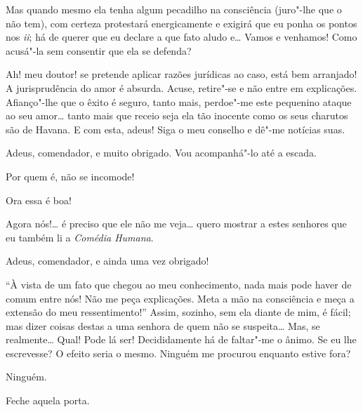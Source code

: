   Mas quando mesmo ela tenha algum pecadilho na
consciência (juro"-lhe que o não tem), com certeza protestará
energicamente e exigirá que eu ponha os pontos nos \textit{ii}; há de
querer que eu declare a que fato aludo e\ldots{} Vamos e venhamos! Como
acusá"-la sem consentir que ela se defenda?

 Ah! meu doutor! se pretende aplicar razões
jurídicas ao caso, está bem arranjado! A jurisprudência do amor é
absurda. Acuse, retire"-se e não entre em explicações. Afianço"-lhe que o
êxito é seguro, tanto mais, perdoe"-me este pequenino ataque ao seu
amor\ldots{}  tanto mais que receio seja ela tão inocente como os seus
charutos são de Havana.  E com esta, adeus! Siga o meu conselho e dê"-me
notícias suas. 

   Adeus, comendador,
e muito obrigado. Vou acompanhá"-lo até a escada.

  Por quem é, não se incomode!

  Ora essa é boa! 

  
Agora nós!\ldots{} é preciso que ele não me veja\ldots{} quero mostrar a estes
senhores que eu também li a \textit{Comédia Humana}. 

  Adeus,
comendador, e ainda uma vez obrigado! 


  ``À vista de um fato que chegou
ao meu conhecimento, nada mais pode haver de comum entre nós! Não me
peça explicações. Meta a mão na consciência e meça a extensão do meu
ressentimento!'' Assim, sozinho, sem ela diante de mim, é
fácil; mas dizer coisas destas a uma senhora de quem não se suspeita\ldots{} 
Mas, se realmente\ldots{} Qual! Pode lá ser! Decididamente há de faltar"-me o
ânimo.  Se eu lhe escrevesse? O
efeito seria o mesmo.  Ninguém me procurou enquanto estive fora?

  Ninguém.

  Feche aquela porta. 

